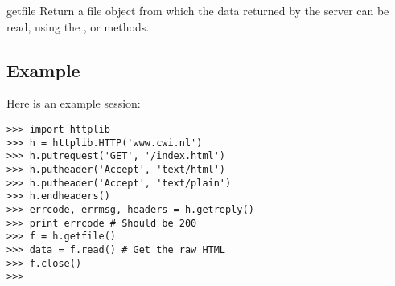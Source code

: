 \begin{funcdesc}{getfile}{}
Return a file object from which the data returned by the server can be
read, using the ,  or 
methods.
\end{funcdesc}

\subsection{Example}

Here is an example session:

\bcode\begin{verbatim}
>>> import httplib
>>> h = httplib.HTTP('www.cwi.nl')
>>> h.putrequest('GET', '/index.html')
>>> h.putheader('Accept', 'text/html')
>>> h.putheader('Accept', 'text/plain')
>>> h.endheaders()
>>> errcode, errmsg, headers = h.getreply()
>>> print errcode # Should be 200
>>> f = h.getfile()
>>> data = f.read() # Get the raw HTML
>>> f.close()
>>> 
\end{verbatim}\ecode
